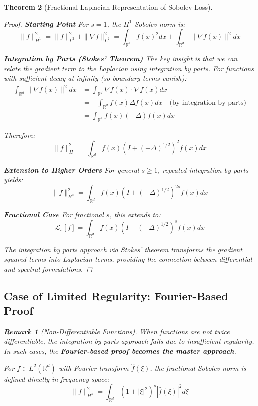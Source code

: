 \documentclass{article}
\newtheorem{theorem}{Theorem}[section]
\newtheorem{remark}[theorem]{Remark}
\begin{document}
\begin{theorem}[Fractional Laplacian Representation of Sobolev Loss]
\begin{proof}
\textbf{Starting Point}
For $s = 1$, the $H^1$ Sobolev norm is:
\[ \|f\|_{H^1}^2 = \|f\|_{L^2}^2 + \|\nabla f\|_{L^2}^2 = \int_{\mathbb{R}^d} f(x)^2 dx + \int_{\mathbb{R}^d} \|\nabla f(x)\|^2 dx \]

\textbf{Integration by Parts (Stokes' Theorem)}
The key insight is that we can relate the gradient term to the Laplacian using integration by parts. For functions with sufficient decay at infinity (so boundary terms vanish):
\begin{align}
\int_{\mathbb{R}^d} \|\nabla f(x)\|^2 dx &= \int_{\mathbb{R}^d} \nabla f(x) \cdot \nabla f(x) dx \\
&= -\int_{\mathbb{R}^d} f(x) \Delta f(x) dx \quad \text{(by integration by parts)} \\
&= \int_{\mathbb{R}^d} f(x) (-\Delta) f(x) dx
\end{align}

Therefore:
\[ \|f\|_{H^1}^2 = \int_{\mathbb{R}^d} f(x) (I + (-\Delta)^{1/2})^2 f(x) dx \]

\textbf{Extension to Higher Orders}
For general $s \geq 1$, repeated integration by parts yields:
\[ \|f\|_{H^s}^2 = \int_{\mathbb{R}^d} f(x) (I + (-\Delta)^{1/2})^{2s} f(x) dx \]

\textbf{Fractional Case}
For fractional $s$, this extends to:
\[ \mathcal{L}_s[f] = \int_{\mathbb{R}^d} f(x) (I + (-\Delta)^{1/2})^s f(x) dx \]

The integration by parts approach via Stokes' theorem transforms the gradient squared terms into Laplacian terms, providing the connection between differential and spectral formulations.
\end{proof}

\subsection{Case of Limited Regularity: Fourier-Based Proof}

\begin{remark}[Non-Differentiable Functions]
When functions are not twice differentiable, the integration by parts approach fails due to insufficient regularity. In such cases, the \textbf{Fourier-based proof becomes the master approach}.

For $f \in L^2(\mathbb{R}^d)$ with Fourier transform $\hat{f}(\xi)$, the fractional Sobolev norm is defined directly in frequency space:
\[ \|f\|_{H^s}^2 = \int_{\mathbb{R}^d} (1 + |\xi|^2)^s |\hat{f}(\xi)|^2 d\xi \]


\end{remark}
\end{theorem}
\end{document}
